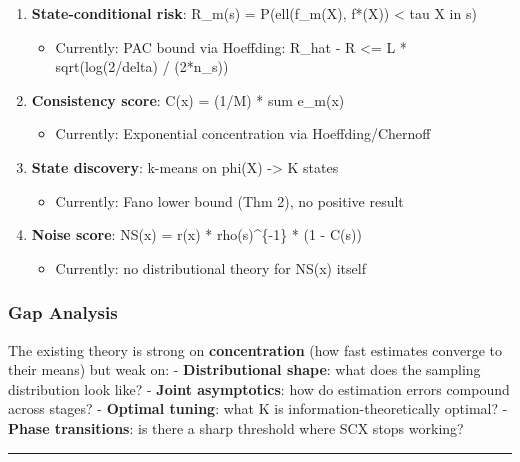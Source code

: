 \documentclass[
  12pt,
]{ctexart}
\providecommand{\tightlist}{%
  \setlength{\itemsep}{0pt}\setlength{\parskip}{0pt}}
\begin{document}
\begin{enumerate}
\def\labelenumi{\arabic{enumi}.}
\tightlist
\item
  \textbf{State-conditional risk}: R\_m(s) = P(ell(f\_m(X), f*(X))
  \textless{} tau \textbar{} X in s)

  \begin{itemize}
  \tightlist
  \item
    Currently: PAC bound via Hoeffding: \textbar R\_hat - R\textbar{}
    \textless= L * sqrt(log(2/delta) / (2*n\_s))
  \end{itemize}
\item
  \textbf{Consistency score}: C(x) = (1/M) * sum e\_m(x)

  \begin{itemize}
  \tightlist
  \item
    Currently: Exponential concentration via Hoeffding/Chernoff
  \end{itemize}
\item
  \textbf{State discovery}: k-means on phi(X) -\textgreater{} K states

  \begin{itemize}
  \tightlist
  \item
    Currently: Fano lower bound (Thm 2), no positive result
  \end{itemize}
\item
  \textbf{Noise score}: NS(x) = r(x) * rho(s)\^{}\{-1\} * (1 - C(s))

  \begin{itemize}
  \tightlist
  \item
    Currently: no distributional theory for NS(x) itself
  \end{itemize}
\end{enumerate}

\subsubsection{Gap Analysis}\label{gap-analysis}

The existing theory is strong on \textbf{concentration} (how fast
estimates converge to their means) but weak on: - \textbf{Distributional
shape}: what does the sampling distribution look like? - \textbf{Joint
asymptotics}: how do estimation errors compound across stages? -
\textbf{Optimal tuning}: what K is information-theoretically optimal? -
\textbf{Phase transitions}: is there a sharp threshold where SCX stops
working?

\begin{center}\rule{0.5\linewidth}{0.5pt}\end{center}
\end{document}
